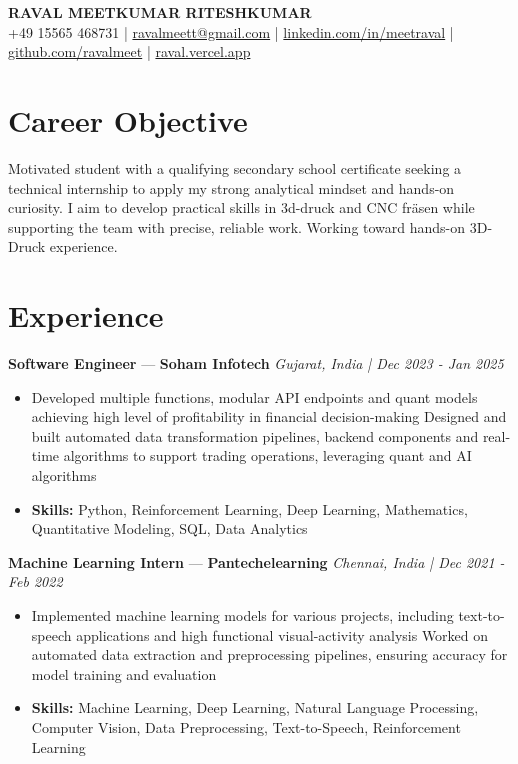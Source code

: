 \documentclass[a4paper,10pt]{article}
\begin{document}
\begin{center}
  {\Large\bfseries RAVAL MEETKUMAR RITESHKUMAR}\\[2pt]
  {\small +49 15565 468731 \;|\; \href{mailto:ravalmeett@gmail.com}{ravalmeett@gmail.com} \;|\; \href{https://www.linkedin.com/in/meetraval/}{linkedin.com/in/meetraval} \;|\; \href{https://github.com/ravalmeet}{github.com/ravalmeet} \;|\; \href{https://raval.vercel.app/}{raval.vercel.app}}
\end{center}
\vspace{-3pt}

\section*{Career Objective}
Motivated student with a qualifying secondary school certificate seeking a technical internship to apply my strong analytical mindset and hands-on curiosity. I aim to develop practical skills in 3d-druck and CNC fräsen while supporting the team with precise, reliable work. Working toward hands-on 3D-Druck experience.\par

\section*{Experience}
\textbf{Software Engineer} — \textbf{Soham Infotech} \hfill \textit{Gujarat, India \;|\; Dec 2023 - Jan 2025}\par
\vspace{1pt}
\begin{itemize}
  \item Developed multiple functions, modular API endpoints and quant models achieving high level of profitability in financial decision-making Designed and built automated data transformation pipelines, backend components and real-time algorithms to support trading operations, leveraging quant and AI algorithms
  \item \textbf{Skills:} Python, Reinforcement Learning, Deep Learning, Mathematics, Quantitative Modeling, SQL, Data Analytics
\end{itemize}
\vspace{3pt}
\textbf{Machine Learning Intern} — \textbf{Pantechelearning} \hfill \textit{Chennai, India \;|\; Dec 2021 - Feb 2022}\par
\vspace{1pt}
\begin{itemize}
  \item Implemented machine learning models for various projects, including text-to-speech applications and high functional visual-activity analysis Worked on automated data extraction and preprocessing pipelines, ensuring accuracy for model training and evaluation
  \item \textbf{Skills:} Machine Learning, Deep Learning, Natural Language Processing, Computer Vision, Data Preprocessing, Text-to-Speech, Reinforcement Learning
\end{itemize}
\end{document}

